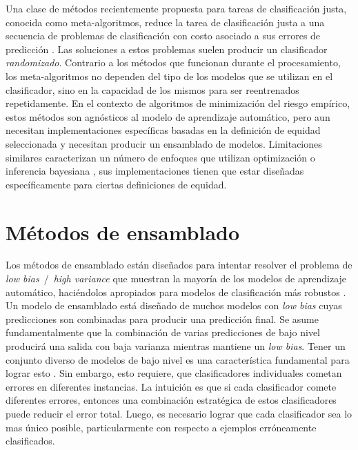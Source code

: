 Una clase de métodos recientemente propuesta para tareas de clasificación justa, conocida como meta-algoritmos, reduce la tarea de clasificación justa a una secuencia de problemas de clasificación con costo asociado a sus errores de predicción \parencite{agarwal2018reductions, agarwal2019fair, kearns2018preventing}.
Las soluciones a estos problemas suelen producir un clasificador \emph{randomizado}. Contrario a los métodos que funcionan durante el procesamiento, los meta-algoritmos no dependen del tipo de los modelos que se utilizan en el clasificador, sino en la capacidad de los mismos para ser reentrenados repetidamente.
En el contexto de algoritmos de minimización del riesgo empírico, estos métodos son agnósticos al modelo de aprendizaje automático, pero aun necesitan implementaciones específicas basadas en la definición de equidad seleccionada y necesitan producir un ensamblado de modelos. Limitaciones similares caracterizan un número de enfoques que utilizan optimización \parencite{chiappa2018causal,Dimitrakakis_Liu_Parkes_Radanovic_2019} o inferencia bayesiana \parencite{kearns2018preventing,thomas2019preventing}, sus implementaciones tienen que estar diseñadas específicamente para ciertas definiciones de equidad.


\section{Métodos de ensamblado}\label{section:ensembles}

Los métodos de ensamblado están diseñados para intentar resolver el problema de \emph{low bias}~/~\emph{high variance} que muestran la mayoría de los modelos de aprendizaje automático, haciéndolos apropiados para modelos de clasificación más robustos \parencite{polikar2006ensemble}.
Un modelo de ensamblado está diseñado de muchos modelos con \emph{low bias} cuyas predicciones son combinadas para producir una predicción final.
Se asume fundamentalmente que la combinación de varias predicciones de bajo nivel producirá una salida con baja varianza mientras mantiene un \emph{low bias}.
Tener un conjunto diverso de modelos de bajo nivel es una característica fundamental para lograr esto \parencite{polikar2006ensemble}.
Sin embargo, esto requiere, que clasificadores individuales cometan errores en diferentes instancias.
La intuición es que si cada clasificador comete diferentes errores, entonces una combinación estratégica de estos clasificadores puede reducir el error total. Luego, es necesario lograr que cada clasificador sea lo mas único posible, particularmente con respecto a ejemplos erróneamente clasificados.

